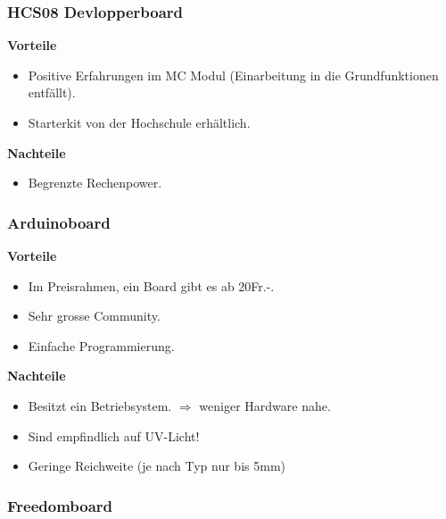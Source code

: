 
\subsubsection{HCS08 Devlopperboard}
\textbf {Vorteile}
\begin{itemize}
\item Positive Erfahrungen im MC Modul (Einarbeitung in die Grundfunktionen entfällt).
\item Starterkit von der Hochschule erhältlich. \\
\end{itemize}
\textbf {Nachteile}
\begin{itemize}
\item Begrenzte Rechenpower.	
\end{itemize}

\subsubsection{Arduinoboard}
\textbf {Vorteile}
\begin{itemize}
\item Im Preisrahmen, ein Board gibt es ab 20Fr.-.
\item Sehr grosse Community.
\item Einfache Programmierung.\\
\end{itemize}
\textbf {Nachteile}
\begin{itemize}
\item Besitzt ein Betriebsystem. $\Rightarrow$ weniger Hardware nahe.
\item Sind empfindlich auf UV-Licht!
\item Geringe Reichweite (je nach Typ nur bis 5mm)
\end{itemize}

\subsubsection{Freedomboard}

